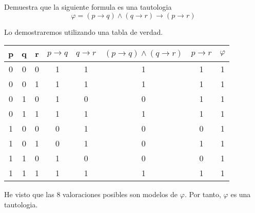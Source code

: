 \begin{example}
	Demuestra que la siguiente formula es una tautologia
	\[
		\varphi = (p \rightarrow q) \wedge (q \rightarrow r) \rightarrow (p \rightarrow r )
	\]

	Lo demostraremos utilizando una tabla de verdad.

	\begin{table}[H]
		\centering
		\begin{tabular}{|c|c|c|c|c|c|c|c|}
			\hline
			p & q & r & \(p \rightarrow q \) & \(q \rightarrow r \) & \((p \rightarrow q) \wedge (q \rightarrow r)\) & \(p \rightarrow r \) & \(\varphi \) \\ \hline
			\hline
			0 & 0 & 0 & 1                    & 1                    & 1                                              & 1                    & 1            \\ \hline
			0 & 0 & 1 & 1                    & 1                    & 1                                              & 1                    & 1            \\ \hline
			0 & 1 & 0 & 1                    & 0                    & 0                                              & 1                    & 1            \\ \hline
			0 & 1 & 1 & 1                    & 1                    & 1                                              & 1                    & 1            \\ \hline
			1 & 0 & 0 & 0                    & 1                    & 0                                              & 0                    & 1            \\ \hline
			1 & 0 & 1 & 0                    & 1                    & 0                                              & 1                    & 1            \\ \hline
			1 & 1 & 0 & 1                    & 0                    & 0                                              & 0                    & 1            \\ \hline
			1 & 1 & 1 & 1                    & 1                    & 1                                              & 1                    & 1            \\
			\hline
		\end{tabular}
		\label{tab:label}
	\end{table}
	He visto que las 8 valoraciones posibles son modelos de \(\varphi\). Por tanto, \(\varphi\) es una tautologia.
\end{example}

